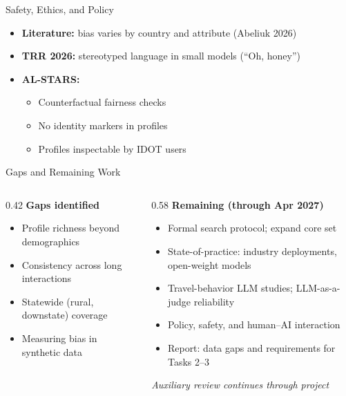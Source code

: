 \documentclass{beamer}
\begin{document}
\begin{frame}{Safety, Ethics, and Policy}
\begin{itemize}
\item \textbf{Literature:} bias varies by country and attribute (Abeliuk 2026)
\item \textbf{TRR 2026:} stereotyped language in small models (``Oh, honey'')
\item \textbf{AL-STARS:}
\begin{itemize}
\item Counterfactual fairness checks
\item No identity markers in profiles
\item Profiles inspectable by IDOT users
\end{itemize}
\end{itemize}
\end{frame}


\begin{frame}{Gaps and Remaining Work}
\begin{columns}[t]
\begin{column}{0.42\textwidth}
\textbf{Gaps identified}
\begin{itemize}
\item Profile richness beyond demographics
\item Consistency across long interactions
\item Statewide (rural, downstate) coverage
\item Measuring bias in synthetic data
\end{itemize}
\end{column}
\begin{column}{0.58\textwidth}
\textbf{Remaining (through Apr 2027)}
\begin{itemize}
\item Formal search protocol; expand core set
\item State-of-practice: industry deployments, open-weight models
\item Travel-behavior LLM studies; LLM-as-a-judge reliability
\item Policy, safety, and human--AI interaction
\item Report: data gaps and requirements for Tasks 2--3
\end{itemize}
\vspace{1ex}
\textit{Auxiliary review continues through project}
\end{column}
\end{columns}
\end{frame}
\end{document}
